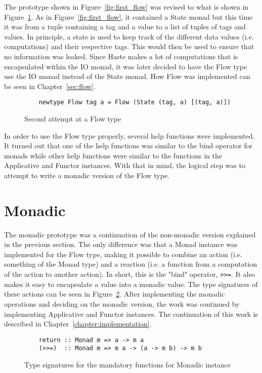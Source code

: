 The prototype shown in Figure~\ref{fig:first_flow} was revised to what is shown in Figure~\ref{fig:second_flow}. As in Figure~\ref{fig:first_flow}, it contained a State monad but this time it was from a tuple containing a tag and a value to a list of tuples of tags and values. In principle, a state is used to keep track of the different data values (i.e. computations) and their respective tags. This would then be used to ensure that no information was leaked. Since Haste makes a lot of computations that is encapsulated within the IO monad, it was later decided to have the Flow type use the IO monad instead of the State monad. How Flow was implemented can be seen in Chapter~\ref{sec:flow}.
\begin{figure}[h]
  \begin{verbatim}
    newtype Flow tag a = Flow (State (tag, a) [(tag, a)])
  \end{verbatim}
  \caption{Second attempt at a Flow type}
  \label{fig:second_flow}
\end{figure}

In order to use the Flow type properly, several help functions were implemented. It turned out that one of the help functions was similar to the bind operator for monads while other help functions were similar to the functions in the Applicative and Functor instances. With that in mind, the logical step was to attempt to write a monadic version of the Flow type.
\section{Monadic}
The monadic prototype was a continuation of the non-monadic version explained in the previous section. The only difference was that a Monad instance was implemented for the Flow type, making it possible to combine an action (i.e. something of the Monad type) and a reaction (i.e. a function from a computation of the action to another action). In short, this is the "bind" operator, {\tt >>=}. It also makes it easy to encapsulate a value into a monadic value. The type signatures of these actions can be seen in Figure~\ref{fig:monadic_actions}. After implementing the monadic operations and deciding on the monadic version, the work was continued by implementing Applicative and Functor instances. The continuation of this work is described in Chapter~\ref{chapter:implementation}.
\begin{figure}[h]
  \begin{verbatim}
    return :: Monad m => a -> m a
    (>>=)  :: Monad m => m a -> (a -> m b) -> m b
  \end{verbatim}
  \caption{Type signatures for the mandatory functions for Monadic instance}
  \label{fig:monadic_actions}
\end{figure}
